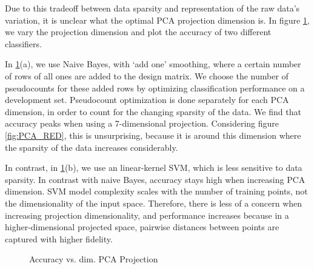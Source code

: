 \documentclass[]{article}
\begin{document}
Due to this tradeoff between data sparsity and representation of the raw data's variation, it is unclear what the optimal PCA projection dimension is. In figure \ref{fig:pca_acc_vs_proj_dim}, we vary the projection dimension and plot the accuracy of two different classifiers. 

In \ref{fig:pca_acc_vs_proj_dim}(a), we use Naive Bayes, with `add one' smoothing, where a certain number of rows of all ones are added to the design matrix. We choose the number of pseudocounts for these added rows by optimizing classification performance on a development set. Pseudocount optimization is done separately for each PCA dimension, in order to count for the changing sparsity of the data. We find that accuracy peaks when using a 7-dimensional projection. Considering figure  \ref{fig:PCA_RED}, this is unsurprising, because it is around this dimension where the sparsity of the data increases considerably. 

In contrast, in \ref{fig:pca_acc_vs_proj_dim}(b), we use an linear-kernel SVM, which is less sensitive to data sparsity. In contrast with naive Bayes, accuracy stays high when increasing PCA dimension. SVM model complexity scales with the number of training points, not the dimensionality of the input space. Therefore, there is less of a concern when increasing projection dimensionality, and performance increases because in a higher-dimensional projected space, pairwise distances between points are captured with higher fidelity. 

\begin{figure}[!ht]
\centering
{}
\caption{Accuracy vs. dim. PCA Projection}
\label{fig:pca_acc_vs_proj_dim}
\end{figure}
\end{document}
